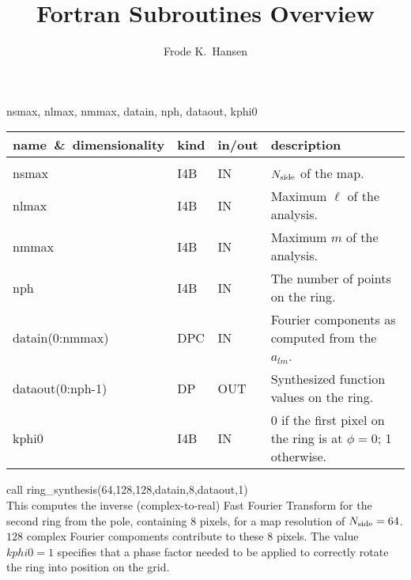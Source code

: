 
\sloppy


\title{\healpix Fortran Subroutines Overview}
 \section[ring\_synthesis]{ }
\label{sub:ring_synthesis}
\author{Frode K.~Hansen}

\begin{facility}
{}
{\modAlmTools}
\end{facility}

\begin{f90format}
{nsmax, nlmax, nmmax, datain, nph, dataout, kphi0}
\end{f90format}

\begin{arguments}
{
\begin{tabular}{p{0.4\hsize} p{0.05\hsize} p{0.1\hsize} p{0.35\hsize}} \hline  
\textbf{name~\&~dimensionality} & \textbf{kind} & \textbf{in/out} & \textbf{description} \\ \hline
                   &   &   &                           \\ %
nsmax & I4B & IN & ${N_{\rm side}}$ of the map.  \\
nlmax & I4B & IN & Maximum $\ell$ of the analysis. \\
nmmax & I4B & IN & Maximum $m$ of the analysis. \\
nph & I4B & IN & The number of points on the ring. \\ 
datain(0:nmmax) & DPC & IN & Fourier components as computed from the $a_{lm}$. \\
dataout(0:nph-1) & DP & OUT & Synthesized function values on the ring. \\
kphi0 & I4B & IN &  0 if the first pixel on the ring is  at
                   $\phi=0$; 1 otherwise. \\
\end{tabular}
}
\end{arguments}

\begin{example}
{
call ring\_synthesis(64,128,128,datain,8,dataout,1)   \\
}
{
This computes the inverse (complex-to-real) Fast Fourier Transform for
the second ring from the pole, containing $8$ pixels, for a map
resolution of ${N_{\rm side}}=64$. $128$ complex Fourier
compoments contribute to these 8 pixels. The value $kphi0=1$ specifies
that a phase factor needed to be applied to correctly
rotate the ring into position on the \healpix grid.
}
\end{example}

